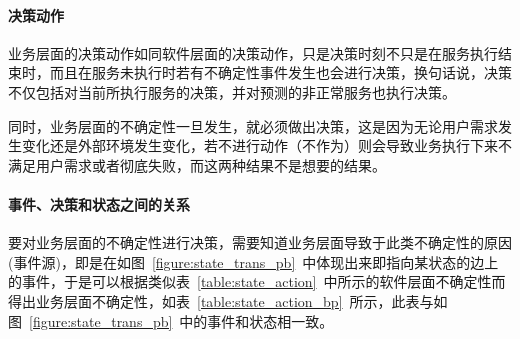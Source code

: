\paragraph{决策动作}

业务层面的决策动作如同软件层面的决策动作，只是决策时刻不只是在服务执行结束时，而且在服务未执行时若有不确定性事件发生也会进行决策，换句话说，决策不仅包括对当前所执行服务的决策，并对预测的非正常服务也执行决策。

同时，业务层面的不确定性一旦发生，就必须做出决策，这是因为无论用户需求发生变化还是外部环境发生变化，若不进行动作（不作为）则会导致业务执行下来不满足用户需求或者彻底失败，而这两种结果不是想要的结果。

\paragraph{事件、决策和状态之间的关系}

要对业务层面的不确定性进行决策，需要知道业务层面导致于此类不确定性的原因(事件源)，即是在如图~\ref{figure:state_trans_pb}~中体现出来即指向某状态的边上的事件，于是可以根据类似表~\ref{table:state_action}~中所示的软件层面不确定性而得出业务层面不确定性，如表~\ref{table:state_action_bp}~所示，此表与如图~\ref{figure:state_trans_pb}~中的事件和状态相一致。

